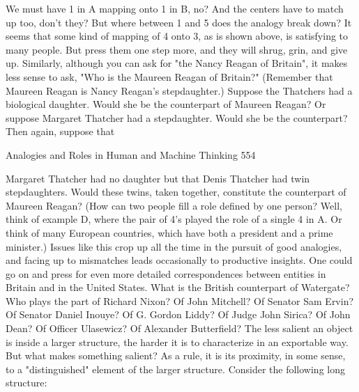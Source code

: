         We must have 1 in A mapping onto 1 in B, no? And the centers have to match
up too, don't they? But where between 1 and 5 does the analogy break down? It seems
that some kind of mapping of 4 onto 3, as is shown above, is satisfying to many
people. But press them one step more, and they will shrug, grin, and give up.
        Similarly, although you can ask for "the Nancy Reagan of Britain", it makes
less sense to ask, "Who is the Maureen Reagan of Britain?" (Remember that Maureen
Reagan is Nancy Reagan's stepdaughter.) Suppose the Thatchers had a biological
daughter. Would she be the counterpart of Maureen Reagan? Or suppose Margaret
Thatcher had a stepdaughter. Would she be the counterpart? Then again, suppose that




Analogies and Roles in Human and Machine Thinking                                     554

Margaret Thatcher had no daughter but that Denis Thatcher had twin stepdaughters.
Would these twins, taken together, constitute the counterpart of Maureen Reagan?
(How can two people fill a role defined by one person? Well, think of example D,
where the pair of 4's played the role of a single 4 in A. Or think of many European
countries, which have both a president and a prime minister.)
         Issues like this crop up all the time in the pursuit of good analogies, and facing
up to mismatches leads occasionally to productive insights. One could go on and press
for even more detailed correspondences between entities in Britain and in the United
States. What is the British counterpart of Watergate? Who plays the part of Richard
Nixon? Of John Mitchell? Of Senator Sam Ervin? Of Senator Daniel Inouye? Of G.
Gordon Liddy? Of Judge John Sirica? Of John Dean? Of Officer Ulasewicz? Of
Alexander Butterfield? The less salient an object is inside a larger structure, the harder
it is to characterize in an exportable way.
         But what makes something salient? As a rule, it is its proximity, in some
sense, to a "distinguished" element of the larger structure. Consider the following long
structure:


